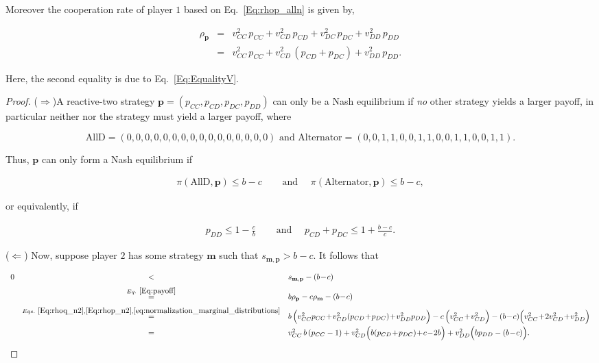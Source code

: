 \documentclass{article}
\theoremstyle{definition}
\begin{document}
Moreover the cooperation rate of player $1$ based on Eq.~\ref{Eq:rhop_alln} is given by,

\begin{equation} \label{Eq:rhop_n2}
\begin{array}{lll}
\rho_\mathbf{p} &= &\displaystyle v^2_{CC}\, p_{CC} +  v^2_{CD}\,p_{CD} + v^2_{DC}\, p_{DC} + v^2_{DD}\, p_{DD}\\[0.2cm]
	& =  &v^2_{CC}\, p_{CC} +  v^2_{CD}\,(p_{CD}\!+\!p_{DC}) + v^2_{DD}\, p_{DD}.
\end{array}
\end{equation}

Here, the second equality is due to Eq.~\eqref{Eq:EqualityV}.
 
\begin{proof}
($\Rightarrow$)A reactive-two strategy \(\mathbf{p} = (p_{CC}, p_{CD}, p_{DC},
p_{DD})\) can only be a Nash equilibrium if {\it no} other strategy yields a
larger payoff, in particular neither  nor the 
strategy must yield a larger payoff, where

$$
\text{AllD}=(0, 0, 0, 0, 0, 0, 0, 0, 0, 0, 0, 0, 0, 0, 0, 0) \text{ and } \text{Alternator}=(0, 0, 1, 1, 0, 0, 1, 1, 0, 0, 1, 1, 0, 0, 1, 1).
$$

Thus, \(\mathbf{p}\) can only form a Nash equilibrium if 

\begin{align*}
\pi(\text{AllD}, \mathbf{p}) \leq b\!-\!c & \quad \text{ and } \quad \pi(\text{Alternator}, \mathbf{p}) \leq b\!-\!c,
\end{align*}

or equivalently, if

\begin{align}\label{Eq:NashConditionDonationGame}
  p_{DD} \leq 1 - \frac{c}{b} & \quad \text{ and } \quad  p_{CD} + p_{DC} \leq 1 + \frac{b\!-\!c}{c}.
\end{align}

($\Leftarrow$) Now, suppose player $2$ has some strategy $\mathbf{m}$ such that $s_{\mathbf{m},
\mathbf{p}} > b\!-\!c$. It follows that

\begin{equation} \label{Eq:InequalityPartner}
\begin{array}{rcl}
0 	& <	&s_{\mathbf{m}, \mathbf{p}}-(b\!-\!c)\\[0.2cm]
	&\stackrel{Eq.~\eqref{Eq:payoff}}{=}	&b\rho_\mathbf{p} - c\rho_\mathbf{m}-(b\!-\!c)\\[0.2cm]
	&\stackrel{Eqs.~\eqref{Eq:rhoq_n2}, \eqref{Eq:rhop_n2}, \eqref{eq:normalization_marginal_distributions}}{=}	&b\,\Big( v^2_{CC} p_{CC} \!+\!  v^2_{CD}(p_{CD}\!+\!p_{DC}) \!+\! v^2_{DD} p_{DD}\Big) 
		- c\,\Big(v^2_{CC} \!+\! v^2_{CD}\Big) - (b\!-\!c)\Big(v^2_{CC} \!+\!  2v^2_{CD} \!+\! v^2_{DD}\Big)\\[0.2cm]
	&=	&v^2_{CC} \,b\,(p_{CC}-1) + v^2_{CD}\Big(b(p_{CD}\!+\!p_{DC})\!+\!c\!-\!2b\Big) + v^2_{DD}\Big(bp_{DD}-(b\!-\!c)\Big).
\end{array}
\end{equation}


\end{proof}
\end{document}
